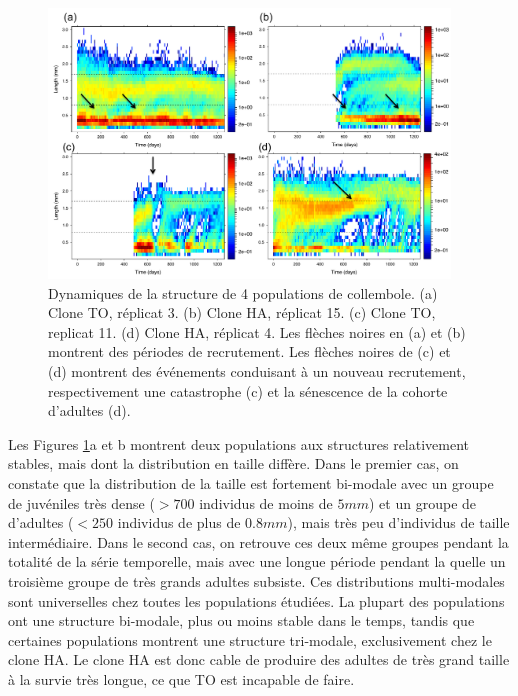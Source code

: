 \begin{figure}[!ht]
\begin{center}
\includegraphics[width=0.95\textwidth]{1_CorpsDeThese/Resumes/Fig/SP01}
\caption[Dynamiques de la
structure de 4 populations]{Dynamiques de la structure de 4 populations de
collembole. (a) Clone TO, réplicat 3. (b) Clone HA, réplicat 15. (c) Clone TO,
replicat 11. (d) Clone HA, réplicat 4. Les flèches noires en (a) et (b) montrent
des périodes de recrutement. Les flèches noires de (c) et (d) montrent des
événements conduisant à un nouveau recrutement, respectivement une catastrophe
(c) et la sénescence de la cohorte d'adultes (d).}
\label{fig:SP1}
\end{center}
\end{figure}

Les Figures \ref{fig:SP1}a et b montrent deux populations aux structures
relativement stables, mais dont la distribution en taille diffère. Dans le
premier cas, on constate que la distribution de la taille est fortement
bi-modale avec un groupe de juvéniles très dense ($>700$ individus de moins de
$5mm$) et un groupe de d'adultes ($<250$ individus de plus de $0.8mm$), mais
très peu d'individus de taille intermédiaire. Dans le second cas, on retrouve
ces deux même groupes pendant la totalité de la série temporelle, mais avec une
longue période pendant la quelle un troisième groupe de très grands adultes
subsiste. Ces distributions multi-modales sont universelles chez toutes les
populations étudiées. La plupart des populations ont une structure bi-modale,
plus ou moins stable dans le temps, tandis que certaines populations montrent
une structure tri-modale, exclusivement chez le clone HA. Le clone HA est donc
cable de produire des adultes de très grand taille à la survie très longue, ce
que TO est incapable de faire. 

